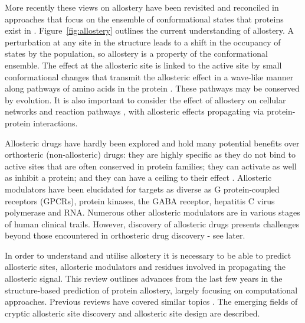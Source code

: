 More recently these views on allostery have been revisited and reconciled in approaches that focus on the ensemble of conformational states that proteins exist in \cite{Motlagh2014, Cui2008}.
Figure~\ref{fig:allostery} outlines the current understanding of allostery.
A perturbation at any site in the structure leads to a shift in the occupancy of states by the population, so allostery is a property of the conformational ensemble.
The effect at the allosteric site is linked to the active site by small conformational changes that transmit the allosteric effect in a wave-like manner along pathways of amino acids in the protein \cite{DelSol2009}.
These pathways may be conserved by evolution.
It is also important to consider the effect of allostery on cellular networks and reaction pathways \cite{Nussinov2013}, with allosteric effects propagating via protein-protein interactions.

Allosteric drugs have hardly been explored and hold many potential benefits over orthosteric (non-allosteric) drugs: they are highly specific as they do not bind to active sites that are often conserved in protein families; they can activate as well as inhibit a protein; and they can have a ceiling to their effect \cite{Wenthur2014}.
Allosteric modulators have been elucidated for targets as diverse as G protein-coupled receptors (GPCRs), protein kinases, the GABA receptor, hepatitis C virus polymerase and RNA.
Numerous other allosteric modulators are in various stages of human clinical trails.
However, discovery of allosteric drugs presents challenges beyond those encountered in orthosteric drug discovery - see later.

In order to understand and utilise allostery it is necessary to be able to predict allosteric sites, allosteric modulators and residues involved in propagating the allosteric signal.
This review outlines advances from the last few years in the structure-based prediction of protein allostery, largely focusing on computational approaches.
Previous reviews have covered similar topics \cite{SchuelerFurman2016, Wagner2016, Guarnera2016, Lu2014}.
The emerging fields of cryptic allosteric site discovery and allosteric site design are described.



